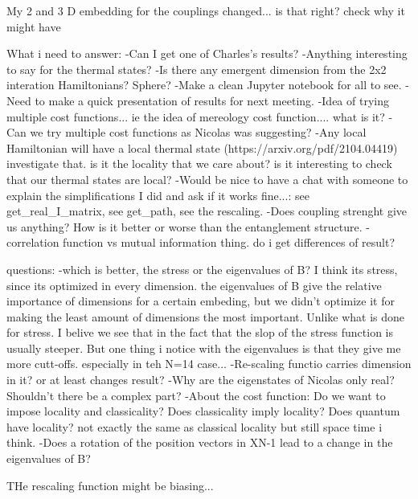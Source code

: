 \documentclass{article}
\begin{document}
My 2 and 3 D embedding for the couplings changed... is that right? check why it might have

What i need to answer:
-Can I get one of Charles's results?
-Anything interesting to say for the thermal states?
-Is there any emergent dimension from the 2x2 interation Hamiltonians? Sphere?
-Make a clean Jupyter notebook for all to see.
-Need to make a quick presentation of results for next meeting.
-Idea of trying multiple cost functions... ie the idea of mereology cost function.... what is it?
-Can we try multiple cost functions as Nicolas was suggesting?
-Any local Hamiltonian will have  a local thermal state (https://arxiv.org/pdf/2104.04419) investigate that. is it the locality that we care about? is it interesting to check that our thermal states are local?
-Would be nice to have a chat with someone to explain the simplifications I did and ask if it works fine...: see get_real_I_matrix, see get_path, see the rescaling.
-Does coupling strenght give us anything? How is it better or worse than the entanglement structure.
-correlation function vs mutual information thing. do i get differences of result?

questions: 
-which is better, the stress or the eigenvalues of B? I think its stress, since its optimized in every dimension.
the eigenvalues of B give the relative importance of dimensions for a certain embeding, but we didn't optimize it for making the least amount of dimensions the most important. Unlike what is done for stress.
I belive we see that in the fact that the slop of the stress function is usually steeper. But one thing i notice with the eigenvalues is that they give me more cutt-offs. especially in teh N=14 case...
-Re-scaling functio carries dimension in it? or at least changes result?
-Why are the eigenstates of Nicolas only real? Shouldn’t there be a complex part?
-About the cost function: Do we want to impose locality and classicality? Does classicality imply locality? Does quantum have locality? not exactly the same as classical locality but still space time i think.
-Does a rotation of the position vectors in XN-1 lead to a change in the eigenvalues of B?

THe rescaling function might be biasing...
\end{document}
